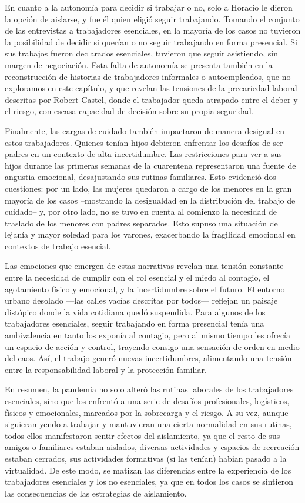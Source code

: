 En cuanto a la autonomía para decidir si trabajar o no, solo a Horacio le dieron la opción de aislarse, y fue él quien eligió seguir trabajando. Tomando el conjunto de las entrevistas a trabajadores esenciales, en la mayoría de los casos no tuvieron la posibilidad de decidir si querían o no seguir trabajando en forma presencial. Si sus trabajos fueron declarados esenciales, tuvieron que seguir asistiendo, sin margen de negociación. Esta falta de autonomía se presenta también en la reconstrucción de historias de trabajadores informales o autoempleados, que no exploramos en este capítulo, y que revelan las tensiones de la precariedad laboral descritas por Robert Castel, donde el trabajador queda atrapado entre el deber y el riesgo, con escasa capacidad de decisión sobre su propia seguridad.

Finalmente, las cargas de cuidado también impactaron de manera desigual en estos trabajadores. Quienes tenían hijos debieron enfrentar los desafíos de ser padres en un contexto de alta incertidumbre. Las restricciones para ver a sus hijos durante las primeras semanas de la cuarentena representaron una fuente de angustia emocional, desajustando sus rutinas familiares. Esto evidenció dos cuestiones: por un lado, las mujeres quedaron a cargo de los menores en la gran mayoría de los casos --mostrando la desigualdad en la distribución del trabajo de cuidado-- y, por otro lado, no se tuvo en cuenta al comienzo la necesidad de traslado de los menores con padres separados. Esto supuso una situación de lejanía y mayor soledad para los varones, exacerbando la fragilidad emocional en contextos de trabajo esencial.

Las emociones que emergen de estas narrativas revelan una tensión constante entre la necesidad de cumplir con el rol esencial y el miedo al contagio, el agotamiento físico y emocional, y la incertidumbre sobre el futuro. El entorno urbano desolado ---las calles vacías descritas por todos--- reflejan un paisaje distópico donde la vida cotidiana quedó suspendida. Para algunos de los trabajadores esenciales, seguir trabajando en forma presencial tenía una ambivalencia en tanto los exponía al contagio, pero al mismo tiempo les ofrecía un espacio de acción y control, trayendo consigo una sensación de orden en medio del caos. Así, el trabajo generó nuevas incertidumbres, alimentando una tensión entre la responsabilidad laboral y la protección familiar.

En resumen, la pandemia no solo alteró las rutinas laborales de los trabajadores esenciales, sino que los enfrentó a una serie de desafíos profesionales, logísticos, físicos y emocionales, marcados por la sobrecarga y el riesgo. A su vez, aunque siguieran yendo a trabajar y mantuvieran una cierta normalidad en sus rutinas, todos ellos manifestaron sentir efectos del aislamiento, ya que el resto de sus amigos o familiares estaban aislados, diversas actividades y espacios de recreación estaban cerrados, sus actividades formativas (si las tenían) habían pasado a la virtualidad. De este modo, se matizan las diferencias entre la experiencia de los trabajadores esenciales y los no esenciales, ya que en todos los casos se sintieron las consecuencias de las estrategias de aislamiento.

